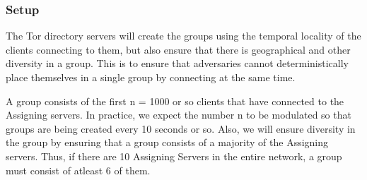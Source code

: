 \subsubsection{Setup}
The Tor directory servers will create the groups using the temporal locality of the clients connecting to them, but also ensure that there is geographical and other diversity in a group. This is to ensure that adversaries cannot deterministically place themselves in a single group by connecting at the same time.

A group consists of the first n = 1000 or so clients that have connected to the Assigning servers. In practice, we expect the number n to be modulated so that groups are being created every 10 seconds or so. Also, we will ensure diversity in the group by ensuring that a group consists of a majority of the Assigning servers. Thus, if there are 10 Assigning Servers in the entire network, a group must consist of atleast 6 of them.


